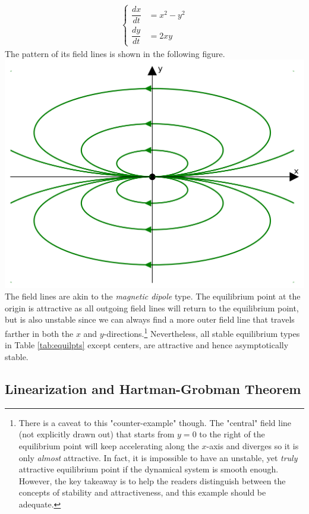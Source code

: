 \begin{align*}
\begin{cases}
\dfrac{dx}{dt} &= x^2 - y^2 \\[10pt]
\dfrac{dy}{dt} &= 2xy
\end{cases}
\end{align*}
The pattern of its field lines is shown in the following figure. \\
\includegraphics[scale=0.6]{graphics/dipolefield.png}\\
The field lines are akin to the \textit{magnetic dipole} type. The equilibrium point at the origin is attractive as all outgoing field lines will return to the equilibrium point, but is also unstable since we can always find a more outer field line that travels farther in both the $x$ and $y$-directions.\footnote{There is a caveat to this "counter-example" though. The "central" field line (not explicitly drawn out) that starts from $y = 0$ to the right of the equilibrium point will keep accelerating along the $x$-axis and diverges so it is only \textit{almost} attractive. In fact, it is impossible to have an unstable, yet \textit{truly} attractive equilibrium point if the dynamical system is smooth enough. However, the key takeaway is to help the readers distinguish between the concepts of stability and attractiveness, and this example should be adequate.} Nevertheless, all stable equilibrium types in Table \ref{tab:equilpts} except centers, are attractive and hence asymptotically stable.

\subsection{Linearization and Hartman-Grobman Theorem}

